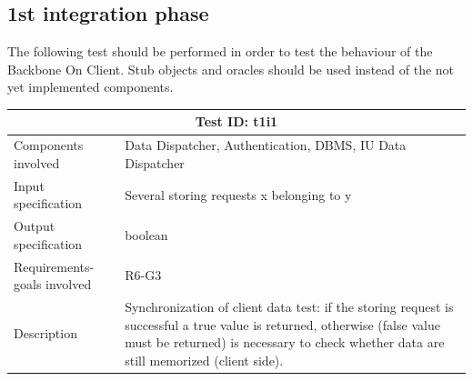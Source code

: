 \subsection{1st integration phase}
The following test should be performed in order to test the behaviour of the Backbone On Client. Stub objects and oracles should be used instead of the not yet implemented components.

\begin{table}[H]
\centering
\begin{tabular}{ |p{4.5cm}||p{11cm}|  }
 \hline
 \multicolumn{2}{|c|}{Test ID: t1i1} \\
 
 \hline 
 Components involved  	& 	 Data Dispatcher, Authentication, DBMS, IU Data Dispatcher\\
 Input specification  	& 	 Several storing requests x belonging to y\\
Output specification  	& boolean\\
Requirements-goals involved & R6-G3\\
Description  	& 	Synchronization of client data test: if the storing request is successful a true value is returned, otherwise (false value must be returned) is necessary to check whether data are still memorized (client side).\\
 \hline
\end{tabular}
\end{table}



